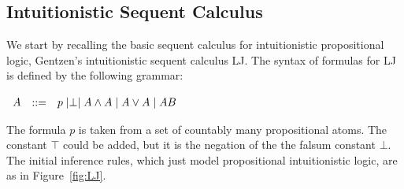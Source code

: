 \documentclass{article}
\let\to\relax
\newcommand{\to}{\rightarrow}
\begin{document}
\subsection{Intuitionistic Sequent Calculus}
We start by recalling the basic sequent calculus for intuitionistic propositional logic, 
Gentzen's intuitionistic sequent calculus LJ.  
The syntax of formulas for LJ is defined by the
following grammar:
\begin{center}
    \begin{math}
        \begin{array}{lllllllll}
            A & ::= & p \mid \perp \mid A \land A \mid A \lor A \mid A \to B
        \end{array}
    \end{math}
\end{center}
The formula $p$ is taken from a set of countably many  propositional atoms. The constant $\top$ could be added, but it is the negation of the the falsum constant $\bot$.
The  initial inference rules, which just model
propositional intuitionistic logic, are as in 
Figure~\ref{fig:LJ}.
\end{document}
